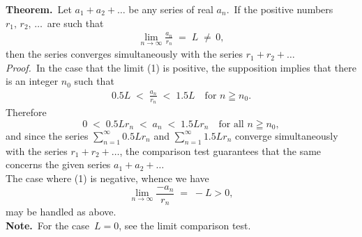 \documentclass[12pt]{article}
\theoremstyle{definition}
\begin{document}
\textbf{Theorem.}\, Let $a_1\!+\!a_2\!+\ldots$ be any series of real  $a_n$.\, If the positive numbers $r_1,\,r_2,\,\ldots$\, are such that
\begin{align}
\lim_{n\to\infty}\frac{a_n}{r_n} \;=\; L \;\neq\, 0,
\end{align}
then the series converges simultaneously with the series $r_1\!+\!r_2\!+\ldots$\\


\emph{Proof.}\, In the case that the limit (1) is positive, the supposition implies that there is an integer $n_0$ such that 
\begin{align}
0.5L \;<\; \frac{a_n}{r_n} \;<\; 1.5L \quad \textrm{for  } n \geqq n_0.
\end{align}
Therefore
$$0 \;<\; 0.5Lr_n \;<\; a_n \;<\; 1.5Lr_n \quad \textrm{for all  } n \geqq n_0,$$
and since the series $\sum_{n=1}^\infty0.5Lr_n$ and $\sum_{n=1}^\infty1.5Lr_n$ converge simultaneously with the series $r_1\!+\!r_2\!+\ldots$, the comparison test guarantees that the same concerns the given series $a_1\!+\!a_2\!+\ldots$\\

The case where (1) is negative, whence we have
$$\lim_{n\to\infty}\frac{-a_n}{r_n} \;=\; -L > 0,$$
may be handled as above.\\


\textbf{Note.}\, For the case\, $L = 0$, see the limit comparison test.


\end{document}
